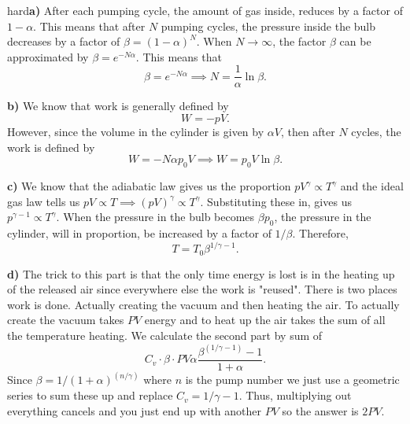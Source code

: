 \begin{solution}{hard}\textbf{a)} After each pumping cycle, the amount of gas inside, reduces by a factor of $1-\alpha$. This means that after $N$ pumping cycles, the pressure inside the bulb decreases by a factor of $\beta = (1-\alpha)^N$. When $N\to\infty$, the factor $\beta$ can be approximated by $\beta = e^{-N\alpha}$. This means that 
\[\beta = e^{-N\alpha}\implies N = \boxed{\frac{1}{\alpha}\ln\beta}.\]
\vspace{3mm}

\noindent\textbf{b)} We know that work is generally defined by 
\[W = -pV.\]
However, since the volume in the cylinder is given by $\alpha V$, then after $N$ cycles, the work is defined by 
\[W = -N\alpha p_0 V\implies W = \boxed{p_0 V \ln\beta}.\]
\vspace{3mm}

\noindent \textbf{c)} We know that the adiabatic law gives us the proportion $pV^\gamma\propto T^\gamma$ and the ideal gas law tells us $pV\propto T\implies (pV)^\gamma \propto T^\gamma.$ Substituting these in, gives us $p^{\gamma - 1} \propto T^\gamma$. When the pressure in the bulb becomes $\beta p_0$, the pressure in the cylinder, will in proportion, be increased by a factor of $1/\beta$. Therefore, 
\[T = \boxed{T_0\beta^{1/\gamma -1}}.\]
\vspace{3mm}

\noindent \textbf{d)} The trick to this part is that the only time energy is lost is in the heating up of the released air since everywhere else the work is "reused". There is two places work is done. Actually creating the vacuum and then heating the air. To actually create the vacuum takes $PV$ energy and to heat up the air takes the sum of all the temperature heating. We calculate the second part by sum of 
\[C_v \cdot \beta \cdot PV \alpha \frac{\beta^{(1/\gamma-1)}-1}{1+\alpha}.\]
Since $\beta = 1/(1+\alpha)^{(n/\gamma)}$ where $n$ is the pump number we just use a geometric series to sum these up and replace $C_v = 1/\gamma - 1$. Thus, multiplying out everything cancels and you just end up with another $PV$ so the answer is $2PV$.
\end{solution}